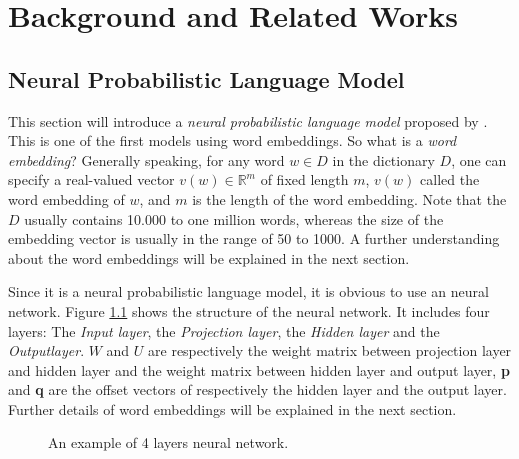 \chapter{Background and Related Works}
\label{cha:embed}

\section{Neural Probabilistic Language Model}



This section will introduce a \emph{neural probabilistic language model} proposed by \cite{BengioDucharmeEtAl2003}. This is one of the first models using word embeddings. So what is a \emph{word embedding}? Generally speaking, for any word $w\in D$ in the dictionary $D$, one can specify a real-valued vector $v(w)\in \mathbb{R}^m$ of fixed length $m$, $v(w)$ called the word embedding of $w$, and $m$ is the length of the word embedding. Note that the $D$ usually contains 10.000 to one million words, whereas the size of the embedding vector is usually in the range of 50 to 1000. A further understanding about the word embeddings will be explained in the next section. 

Since it is a neural probabilistic language model, it is obvious to use an neural network. Figure \ref{fig:neural4} shows the structure of the neural network. It includes four layers: The \emph{Input layer}, the \emph{Projection layer}, the \emph{Hidden layer}  and the \emph{Outputlayer}. $W$ and $U$ are respectively the weight matrix between projection layer and hidden layer and the weight matrix between hidden layer and output layer, \textbf{p} and \textbf{q} are the offset vectors of respectively the hidden layer and the output layer. Further details of word embeddings will be explained in the next section. 


\begin{figure}[tb]
	\centering
	\caption{An example of 4 layers neural network.}
	\label{fig:neural4}
\end{figure}
 

